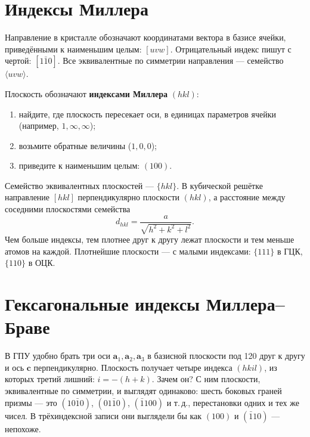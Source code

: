 \section{Индексы Миллера}

Направление в кристалле обозначают координатами вектора в базисе ячейки, приведёнными к наименьшим целым:
$[uvw]$. Отрицательный индекс пишут с чертой: $[1\bar10]$. Все эквивалентные по симметрии направления --- семейство
$\langle uvw\rangle$.

Плоскость обозначают \textbf{индексами Миллера} $(hkl)$:
\begin{enumerate}
\item найдите, где плоскость пересекает оси, в единицах параметров ячейки (например, $1, \infty, \infty$);
\item возьмите обратные величины ($1, 0, 0$);
\item приведите к наименьшим целым: $(100)$.
\end{enumerate}
Семейство эквивалентных плоскостей --- $\{hkl\}$. В кубической решётке направление $[hkl]$ перпендикулярно
плоскости $(hkl)$, а расстояние между соседними плоскостями семейства
\begin{equation}
d_{hkl} = \frac{a}{\sqrt{h^2+k^2+l^2}} .
\end{equation}
Чем больше индексы, тем плотнее друг к другу лежат плоскости и тем меньше атомов на каждой. Плотнейшие плоскости
--- с малыми индексами: $\{111\}$ в ГЦК, $\{110\}$ в ОЦК.


\section{Гексагональные индексы Миллера--Браве}

В ГПУ удобно брать три оси $\mathbf a_1, \mathbf a_2, \mathbf a_3$ в базисной плоскости под 120\textdegree{} друг к
другу и ось $\mathbf c$ перпендикулярно. Плоскость получает четыре индекса $(hkil)$, из которых третий лишний:
$i = -(h+k)$. Зачем он? С ним плоскости, эквивалентные по симметрии, и выглядят одинаково: шесть боковых граней
призмы --- это $(10\bar10)$, $(01\bar10)$, $(\bar1100)$ и т.\,д., перестановки одних и тех же чисел. В трёхиндексной
записи они выглядели бы как $(100)$ и $(\bar110)$ --- непохоже.

